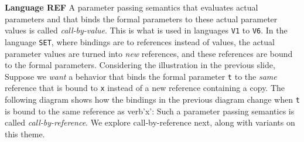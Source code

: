 \begin{minipage}[t]{\sw}
\slidenumber
\LARGE
{\bf Language REF}\exx
A parameter passing semantics that evaluates actual parameters
and that binds the formal parameters
to these actual parameter values
is called {\em call-by-value}.
This is what is used in languages \verb'V1' to \verb'V6'.
In the language \verb'SET',
where bindings are to references instead of values,
the actual parameter values are turned
into {\em new} references,
and these references are bound to the formal parameters.\exx
Considering the illustration in the previous slide,
Suppose we {\em want} a behavior
that binds the formal parameter \verb't'
to the {\em same} reference that is bound to \verb'x'
instead of a new reference containing a copy.
The following diagram shows how the bindings
in the previous diagram change
when \verb't' is bound to the same reference as verb'x':
Such a parameter passing semantics is called
{\em call-by-reference}.
We explore call-by-reference next,
along with variants on this theme.
\end{minipage}
\clearpage
